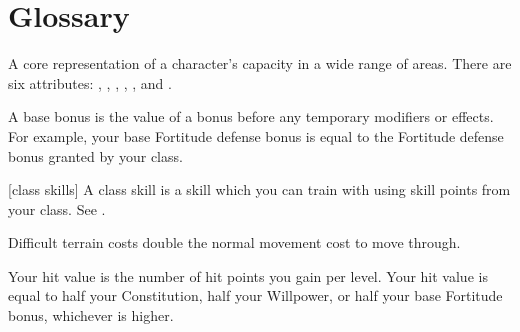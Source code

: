 \chapter{Glossary}\label{Glossary}

 A core representation of a character's capacity in a wide range of areas. There are six attributes: , , , , , and .

 A base bonus is the value of a bonus before any temporary modifiers or effects. For example, your base Fortitude defense bonus is equal to the Fortitude defense bonus granted by your class.

[class skills] A class skill is a skill which you can train with using skill points from your class. See .

 Difficult terrain costs double the normal movement cost to move through.

 Your hit value is the number of hit points you gain per level. Your hit value is equal to half your Constitution, half your Willpower, or half your base Fortitude bonus, whichever is higher.
